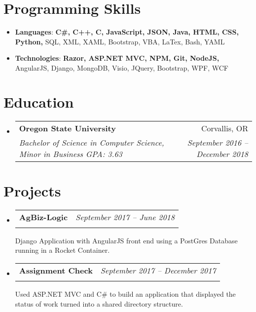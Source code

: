\documentclass[letterpaper,11pt]{article}
\makeatletter
\newcommand{\resumeSubheading}[4]{
  \vspace{-1pt}\item
    \begin{tabular*}{0.97\textwidth}{l@{\extracolsep{\fill}}r}
      \textbf{\Large#1} & #2 \\
      \textit{\small#3} & \textit{\small #4} \\
    \end{tabular*}\vspace{-5pt}
}
\newcommand{\resumeSubHeadingListStart}{\begin{itemize}[label={},leftmargin=*]}
\newcommand{\resumeSubHeadingListEnd}{\end{itemize}}
\makeatother
\begin{document}
  
\section{Programming Skills}
  \resumeSubHeadingListStart
    \item{
     \textbf{Languages}{: \textbf{C\#, C++, C, JavaScript, JSON, Java, HTML, CSS, Python,} SQL, XML, XAML, Bootstrap, VBA, LaTex, Bash, YAML}}
     \item{
      \textbf{Technologies}{: \textbf{Razor, ASP.NET MVC, NPM, Git, NodeJS,} AngularJS, Django, MongoDB, Visio, JQuery, Bootstrap, WPF, WCF}

    }
  \resumeSubHeadingListEnd

\section{Education}
  \resumeSubHeadingListStart
    \resumeSubheading
      {Oregon State University}{Corvallis, OR}
      {Bachelor of Science in Computer Science, Minor in Business  GPA: 3.63}{September 2016 -- December 2018}
  \resumeSubHeadingListEnd

\section{Projects}
  \resumeSubHeadingListStart
    \resumeSubheading
    {AgBiz-Logic}{\textit{September 2017 -- June 2018}}
    {}{}
        Django Application with AngularJS front end using a PostGres Database running in a Rocket Container.\newline \hfill
    
    \resumeSubheading
    {Assignment Check}{\textit{September 2017 -- December 2017}}{}{}
        Used ASP.NET MVC and C\# to build an application that displayed the status of work turned into a shared directory structure.\\

  \resumeSubHeadingListEnd
\end{document}
